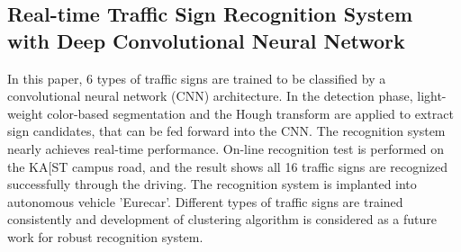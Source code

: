 \subsection{Real-time Traffic Sign Recognition System with Deep Convolutional Neural Network}
In this paper, 6 types of traffic signs are trained to be classified by a convolutional
neural network (CNN) architecture. In the detection phase, light-weight color-based segmentation and the Hough transform  are applied to extract sign candidates, that can be fed forward into the CNN. The recognition system
nearly achieves real-time performance.
On-line
recognition test is performed on the KA[ST campus road,
and the result shows all 16 traffic signs are recognized
successfully through the driving. The recognition system
is implanted into autonomous vehicle 'Eurecar'. Different
types of traffic signs are trained consistently and
development of clustering algorithm is considered as a
future work for robust recognition system.